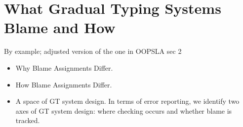 \section{What Gradual Typing Systems Blame and How}


   By example; adjusted version of the one in OOPSLA sec 2

  \begin{itemize}

  \item Why Blame Assignments Differ.

  \item How Blame Assignments Differ.

  \item A space of GT system design. In terms of error reporting, we identify two axes of GT system
        design: where checking occurs and whether blame is tracked.
    \end{itemize}


